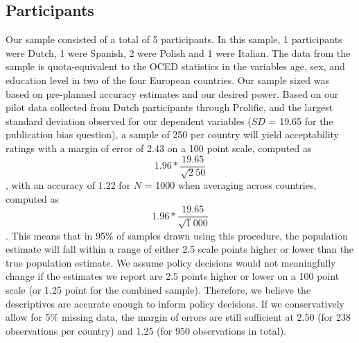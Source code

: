\documentclass[
  man,floatsintext]{apa7}
\begin{document}
\hypertarget{participants}{%
\subsection{Participants}\label{participants}}

Our sample consisted of a total of 5 participants. In this sample, 1 participants were Dutch, 1 were Spanish, 2 were Polish and 1 were Italian. The data from the sample is quota-equivalent to the OCED statistics in the variables age, sex, and education level in two of the four European countries. Our sample sized was based on pre-planned accuracy estimates and our desired power. Based on our pilot data collected from Dutch participants through Prolific, and the largest
standard deviation observed for our dependent variables (\(SD\) = 19.65 for the publication bias question), a sample of 250 per country will yield acceptability ratings with a
margin of error of 2.43 on a 100 point scale, computed as \[1.96 * \frac{19.65}{\sqrt250}\] , with
an accuracy of 1.22 for \(N\) = 1000 when averaging across countries, computed as \[1.96 *
\frac{19.65}{\sqrt1000}\]. This means that in 95\% of samples drawn using this procedure, the
population estimate will fall within a range of either 2.5 scale points higher or lower than
the true population estimate. We assume policy decisions would not meaningfully change
if the estimates we report are 2.5 points higher or lower on a 100 point scale (or 1.25 point
for the combined sample). Therefore, we believe the descriptives are accurate enough to
inform policy decisions. If we conservatively allow for 5\% missing data, the margin of
errors are still sufficient at 2.50 (for 238 observations per country) and 1.25 (for 950
observations in total).
\end{document}
